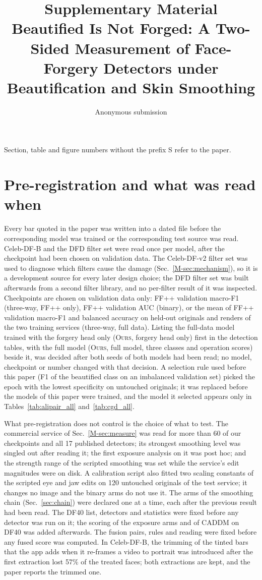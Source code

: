 \documentclass[10pt]{article}
\title{Supplementary Material\\Beautified Is Not Forged: A Two-Sided Measurement of Face-Forgery Detectors under Beautification and Skin Smoothing}
\author{Anonymous submission}\date{}
\newcommand{\oursB}{\textsc{Ours}, forgery head only}
\newcommand{\oursF}{\textsc{Ours}, full model}
\begin{document}
\maketitle
Section, table and figure numbers without the prefix S refer to the paper.

\section{Pre-registration and what was read when}
\label{sec:prereg}
Every bar quoted in the paper was written into a dated file before the corresponding model was trained or the corresponding test
source was read. Celeb-DF-B and the DFD filter set were read once per model, after the checkpoint had been chosen on validation
data. The Celeb-DF-v2 filter set was used to diagnose which filters cause the damage (Sec.~\ref{M-sec:mechanism}), so it is a
development source for every later design choice; the DFD filter set was built afterwards from a second filter library, and no
per-filter result of it was inspected. Checkpoints are chosen on validation data only: FF++ validation macro-F1 (three-way, FF++
only), FF++ validation AUC (binary), or the mean of FF++ validation macro-F1 and balanced accuracy on held-out originals and
renders of the two training services (three-way, full data). Listing the full-data model trained with the forgery head only
(\oursB{}) first in the detection tables, with the full model (\oursF{}, three classes and operation scores) beside it, was
decided after both seeds of both models had been read; no model, checkpoint or number changed with that decision. A selection rule used before this paper (F1 of the beautified class
on an imbalanced validation set) picked the epoch with the lowest specificity on untouched originals; it was replaced before the
models of this paper were trained, and the model it selected appears only in Tables~\ref{tab:alipair_all} and~\ref{tab:cgd_all}.

What pre-registration does not control is the choice of what to test. The commercial service of Sec.~\ref{M-sec:measure} was
read for more than 60 of our checkpoints and all 17 published detectors; its strongest smoothing level was singled out after
reading it; the first exposure analysis on it was post hoc; and the strength range of the scripted smoothing was set while the
service's edit magnitudes were on disk. A calibration script also fitted two scaling constants of the scripted eye and jaw edits on 120
untouched originals of the test service; it changes no image and the binary arms do not use it. The arms of the smoothing chain (Sec.~\ref{sec:chain}) were declared one at a time, each
after the previous result had been read. The DF40 list, detectors and statistics were fixed before any detector was run on it;
the scoring of the exposure arms and of CADDM on DF40 was added afterwards. The fusion pairs, rules and reading were fixed before
any fused score was computed. In Celeb-DF-B, the trimming of the tinted bars that the app adds when it re-frames a video to
portrait was introduced after the first extraction lost 57\% of the treated faces; both extractions are kept, and the paper
reports the trimmed one.
\end{document}
